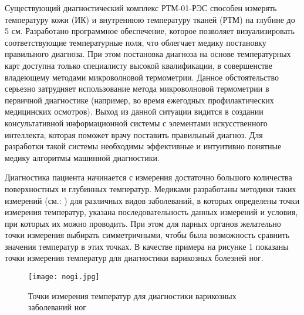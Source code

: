 Существующий диагностический комплекс РТМ-01-РЭС способен измерять температуру кожи (ИК) и внутреннюю температуру тканей (РТМ) на глубине до 5 см. Разработано программное обеспечение, которое позволяет визуализировать соответствующие температурные поля, что облегчает медику постановку правильного диагноза. При этом постановка диагноза на основе температурных карт доступна только специалисту высокой квалификации, в совершенстве владеющему методами микроволновой термометрии. Данное обстоятельство серьезно затрудняет использование метода микроволновой термометрии в первичной диагностике (например, во время ежегодных профилактических медицинских осмотров). Выход из данной ситуации видится в создании консультативной информационной системы с элементами искусственного интеллекта, которая поможет врачу поставить правильный диагноз. Для разработки такой системы необходимы эффективные  и интуитивно понятные медику алгоритмы машинной диагностики.

Диагностика пациента начинается с измерения достаточно большого количества поверхностных и глубинных температур. Медиками разработаны методики таких измерений (см.: \cite{vka1,los4,los5}) для различных видов заболеваний, в которых определены точки измерения температур, указана последовательность данных измерений и условия, при которых их можно проводить. При этом для парных органов желательно точки измерения выбирать симметричными, чтобы была возможность сравнить значения температур в этих точках. В качестве примера на рисунке 1 показаны точки измерения температур для диагностики варикозных болезней ног.

\begin{figure}[h!]
	\centering
    \texttt{[image: nogi.jpg]}
 	\caption{Точки измерения температур для диагностики варикозных заболеваний ног}
 \vspace*{5mm}
\end{figure}

